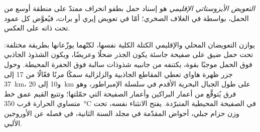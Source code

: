 \begin{definition}\label{def:b3:gravity-geodesy:regional}
\emph{التعويض الأيزوستاتي الإقليمي}
هو إسناد حمل بطفو انحراف ممتدّ على منطقة
أوسع من الحمل، بواسطة  في الغلاف الصخري؛ أمّا في تعويض إيري
أو برات، فيُعوَّض كل عمود تحت ذاته على العكس.
\end{definition}

يوازن التعويضان المحلي والإقليمي الكتلة الكلية نفسها، لكنّهما يوزّعانها
بطريقة مختلفة: تحت حمل ضيق على صفيحة جاسئة يكون الجذر ضحلًا وعريضًا،
ويكون الشذوذ الجاذبي فوق الحمل موجبًا بقوة، يكتنفه من جانبيه شذوذات
سالبة فوق الحفرة المحيطة. وحول جزر ظهرة هاواي تعطي المقاطع الجاذبية
والزلزالية سمكًا مرنًا فعّالًا من 17 إلى \qty{37}{km}،
و10 إلى \qty{20}{km} على طول الجبال البحرية الأقدم في سلسلة الإمبراطور، وهو فرق
يُتوقَّع من أعمار البراكين وأعمار الصفيحة التي حمّلتها؛ وتتبع القيم
عمق خط متساوي الحرارة قرب
\qty{350}{\degreeCelsius} في الصفيحة المحيطية المتبرّدة.
يفتح الانثناء نفسه، تحت وزن حزام جبلي، أحواض
المقدّمة في مجلد السنة الثانية، في فصله عن الأوروجين الألبي.

